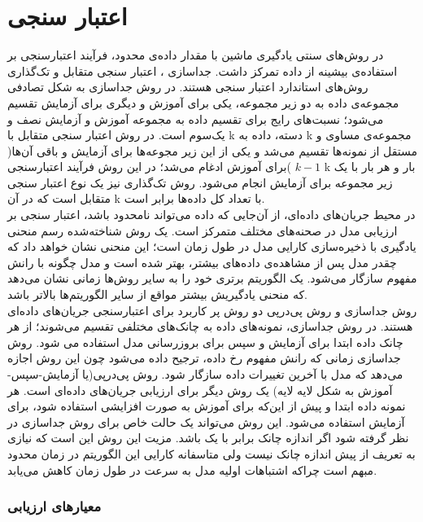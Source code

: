 \section{اعتبار سنجی}
در روش‌های سنتی یادگیری ماشین با مقدار داده‌ی محدود، فرآیند اعتبارسنجی بر استفاده‌ی بیشینه از داده تمرکز داشت. جداسازی
،
اعتبار سنجی متقابل
و تک‌گذاری
روش‌های استاندارد اعتبار سنجی هستند. در روش جداسازی به شکل تصادفی مجموعه‌ی داده به دو زیر مجموعه، یکی برای آموزش و دیگری برای آزمایش تقسیم می‌شود؛ نسبت‌های رایج برای تقسیم داده به مجموعه آموزش و آزمایش نصف و یک‌سوم است. در روش اعتبار سنجی متقابل با k دسته، داده به k مجموعه‌ی مساوی و مستقل از نمونه‌ها تقسیم می‌شد و یکی از این زیر مجوعه‌ها برای آزمایش و باقی آن‌ها( $k-1$ )برای آموزش ادغام می‌شد؛ در این روش فرآیند اعتبارسنجی k بار و هر بار با یک زیر مجموعه برای آزمایش انجام می‌شود. روش تک‌گذاری نیز یک نوع اعتبار سنجی متقابل است که در آن k با تعداد کل داده‌ها برابر است.
\\
در محیط جریان‌های داده‌ای، از آن‌جایی که داده می‌تواند نامحدود باشد، اعتبار سنجی بر ارزیابی مدل در صحنه‌های مختلف متمرکز است\cite{Nguyen2015}. یک روش شناخته‌شده رسم منحنی یادگیری با ذخیره‌سازی کارایی مدل در طول زمان است؛ این منحنی نشان‌ خواهد داد که چقدر مدل پس از مشاهده‌ی داده‌های بیشتر، بهتر شده است و مدل چگونه با رانش‌ مفهوم سازگار می‌شود. یک الگوریتم برتری خود را به سایر روش‌ها زمانی نشان می‌‌دهد که منحنی یادگیریش بیشتر مواقع از سایر الگوریتم‌ها بالا‌تر باشد.
\\
روش جداسازی و روش پی‌درپی
دو روش پر کاربرد برای اعتبارسنجی جریان‌های داده‌ای هستند\cite{Nguyen2015}. در روش جداسازی، نمونه‌های داده به چانک‌های مختلفی تقسیم می‌شوند؛ از هر چانک داده ابتدا برای آزمایش و سپس برای بروزرسانی مدل استفاده می شود. روش جداسازی زمانی که رانش‌ مفهوم رخ داده، ترجیح داده می‌شود چون این روش اجازه می‌دهد که مدل با آخرین تغییرات داده سازگار شود. روش پی‌در‌پی(یا آزمایش-سپس-آموزش
به شکل لایه‌ لایه) یک روش دیگر برای ارزیابی جریان‌های داده‌ای است\cite{bifet2010moa}. هر نمونه داده ابتدا و پیش از این‌که برای آموزش به صورت افزایشی استفاده شود، برای آزمایش استفاده می‌شود. این روش می‌تواند یک حالت خاص برای روش جداسازی در نظر گرفته شود اگر اندازه چانک برابر با یک باشد. مزیت این روش این است که نیازی به تعریف از پیش اندازه چانک نیست ولی متاسفانه کارایی این الگوریتم در زمان محدود  مبهم است چراکه اشتباهات اولیه مدل به سرعت در طول زمان کاهش می‌یابد.


\subsubsection{معیارهای ارزیابی}


